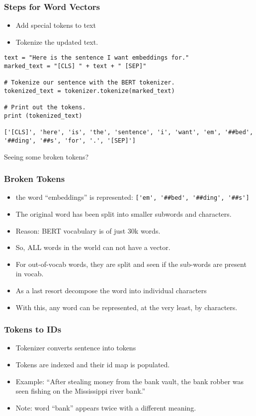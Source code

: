 \begin{frame}[fragile]\frametitle{Steps for Word Vectors}
\begin{itemize}
\item Add special tokens to text
\item Tokenize the updated text.
\end{itemize}
\begin{lstlisting}
text = "Here is the sentence I want embeddings for."
marked_text = "[CLS] " + text + " [SEP]"

# Tokenize our sentence with the BERT tokenizer.
tokenized_text = tokenizer.tokenize(marked_text)

# Print out the tokens.
print (tokenized_text)

['[CLS]', 'here', 'is', 'the', 'sentence', 'i', 'want', 'em', '##bed', '##ding', '##s', 'for', '.', '[SEP]']
\end{lstlisting}

Seeing some broken tokens?
\end{frame}

\begin{frame}[fragile]\frametitle{Broken Tokens}
\begin{itemize}
\item the word ``embeddings'' is represented: \lstinline|['em', '##bed', '##ding', '##s']|
\item The original word has been split into smaller subwords and characters.
\item Reason: BERT vocabulary is of just 30k words.
\item So, ALL words in the world can not have a vector.
\item For out-of-vocab words, they are split and seen if the sub-words are present in vocab.
\item As a last resort decompose the word into individual characters
\item With this, any word can be represented, at the very least, by characters.
\end{itemize}

\end{frame}


\begin{frame}[fragile]\frametitle{Tokens to IDs}
\begin{itemize}
\item Tokenizer converts sentence into tokens
\item Tokens are indexed and their id map is populated.
\item Example: ``After stealing money from the bank vault, the bank robber was seen fishing on the Mississippi river bank.''
\item Note: word ``bank'' appears twice with a different meaning.
\end{itemize}

\end{frame}

